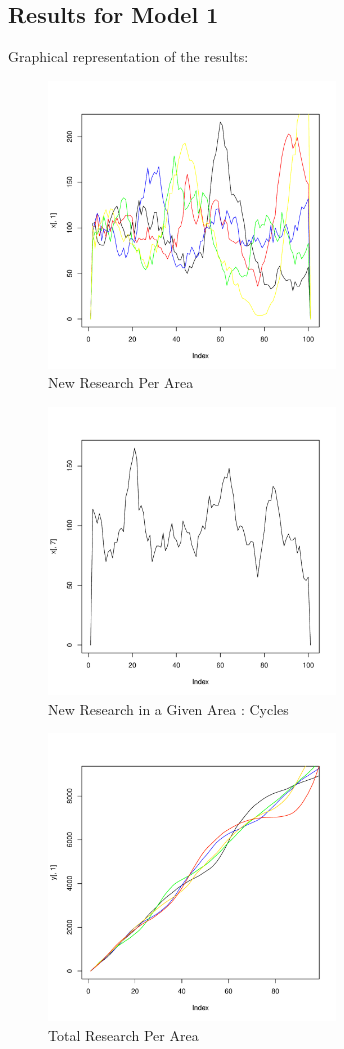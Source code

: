 \documentclass[letterpaper]{article} %
\begin{document}
\subsection{Results for Model 1}
Graphical representation of the results:
\begin{figure}[H]
\begin{center}
\includegraphics[width=3in]{newres.pdf}
\end{center}
\caption{New Research Per Area}
\end{figure}
\begin{figure}[H]
\begin{center}
\includegraphics[width=3in]{newres1.pdf}
\end{center}
\caption{New Research in a Given Area : Cycles}
\end{figure}
\begin{figure}[H]
\begin{center}
\includegraphics[width=3in]{totalres.pdf}
\end{center}
\caption{Total Research Per Area}
\end{figure}
\end{document}
